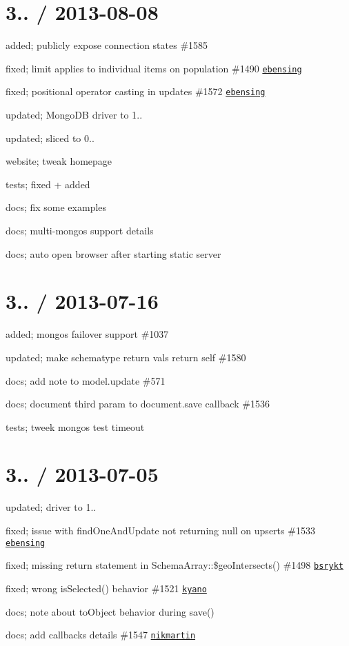 \section*{3.. / 2013-\/08-\/08 }


\begin{DoxyItemize}
\item added; publicly expose connection states \#1585
\item fixed; limit applies to individual items on population \#1490 \href{https://github.com/ebensing}{\tt ebensing}
\item fixed; positional operator casting in updates \#1572 \href{https://github.com/ebensing}{\tt ebensing}
\item updated; Mongo\+DB driver to 1..
\item updated; sliced to 0..
\item website; tweak homepage
\item tests; fixed + added
\item docs; fix some examples
\item docs; multi-\/mongos support details
\item docs; auto open browser after starting static server
\end{DoxyItemize}

\section*{3.. / 2013-\/07-\/16 }


\begin{DoxyItemize}
\item added; mongos failover support \#1037
\item updated; make schematype return vals return self \#1580
\item docs; add note to model.\+update \#571
\item docs; document third param to document.\+save callback \#1536
\item tests; tweek mongos test timeout
\end{DoxyItemize}

\section*{3.. / 2013-\/07-\/05 }


\begin{DoxyItemize}
\item updated; driver to 1..
\item fixed; issue with find\+One\+And\+Update not returning null on upserts \#1533 \href{https://github.com/ebensing}{\tt ebensing}
\item fixed; missing return statement in Schema\+Array\+::\$geo\+Intersects() \#1498 \href{https://github.com/bsrykt}{\tt bsrykt}
\item fixed; wrong is\+Selected() behavior \#1521 \href{https://github.com/kyano}{\tt kyano}
\item docs; note about to\+Object behavior during save()
\item docs; add callbacks details \#1547 \href{https://github.com/nikmartin}{\tt nikmartin}
\end{DoxyItemize}


